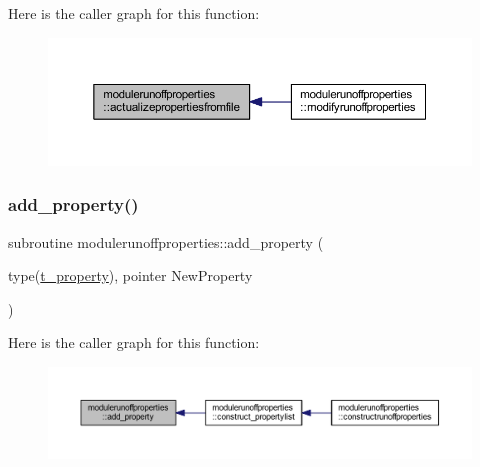 Here is the caller graph for this function\+:\nopagebreak
\begin{figure}[H]
\begin{center}
\leavevmode
\includegraphics[width=350pt]{namespacemodulerunoffproperties_a6cb9ce64b26164eb148aae403b3e9ab0_icgraph}
\end{center}
\end{figure}
\mbox{\label{namespacemodulerunoffproperties_af131ec1efa38bd73fc48b57ad5a02e86}} 
\subsubsection{\texorpdfstring{add\+\_\+property()}{add\_property()}}
{\footnotesize\ttfamily subroutine modulerunoffproperties\+::add\+\_\+property (\begin{DoxyParamCaption}\item[{type(\mbox{\hyperlink{structmodulerunoffproperties_1_1t__property}{t\+\_\+property}}), pointer}]{New\+Property }\end{DoxyParamCaption})\hspace{0.3cm}{\ttfamily [private]}}

Here is the caller graph for this function\+:\nopagebreak
\begin{figure}[H]
\begin{center}
\leavevmode
\includegraphics[width=350pt]{namespacemodulerunoffproperties_af131ec1efa38bd73fc48b57ad5a02e86_icgraph}
\end{center}
\end{figure}
\mbox{\label{namespacemodulerunoffproperties_addd3719940508b59af78d352984c8274}} 
